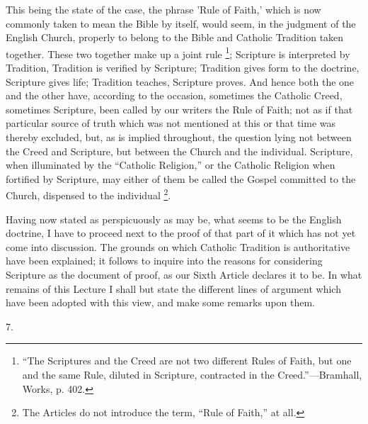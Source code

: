 This being the state of the case, the phrase 'Rule of Faith,' which
is now commonly taken to mean the Bible by itself, would seem, in the
judgment of the English Church, properly to belong to the Bible and
Catholic Tradition taken together. These two together make up a joint
rule \footnote{``The Scriptures and the Creed are not
two different Rules of Faith, but one and the same Rule, diluted in
Scripture, contracted in the Creed.''—Bramhall, Works, p. 402.}; Scripture is
interpreted by Tradition, Tradition is verified by Scripture;
Tradition gives form to the doctrine, Scripture gives life; Tradition
teaches, Scripture proves. And hence both the one and the other have,
according to the occasion, sometimes the Catholic Creed, sometimes
Scripture, been called by our writers the Rule of Faith; not as if
that particular source of truth which was not mentioned at this or
that time was thereby excluded, but, as is implied throughout, the
question lying not between the Creed and Scripture, but between the
Church and the individual. Scripture, when illuminated by the
``Catholic Religion,'' or the Catholic Religion when fortified
by Scripture, may either of them be called the Gospel committed
to the Church, dispensed to the individual \footnote{The Articles do not introduce the term,
``Rule of Faith,'' at all.}.

Having now stated as perspicuously as may be, what seems to be the
English doctrine, I have to proceed next to the proof of that part of
it which has not yet come into discussion. The grounds on which
Catholic Tradition is authoritative have been explained; it follows to
inquire into the reasons for considering Scripture as the document of
proof, as our Sixth Article declares it to be. In what remains of this
Lecture I shall but state the different lines of argument which have
been adopted with this view, and make some remarks upon them.

7.

